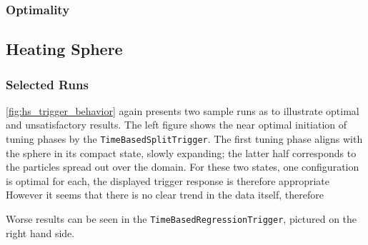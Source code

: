 \subsubsection{Optimality}

\newpage
\subsection{Heating Sphere}
\subsubsection{Selected Runs}
\autoref{fig:hs_trigger_behavior} again presents two sample runs as to illustrate optimal and unsatisfactory results. The left figure shows the near optimal initiation of tuning phases by the \texttt{TimeBasedSplitTrigger}. %
The first tuning phase aligns with the sphere in its compact state, slowly expanding; the latter half corresponds to the particles spread out over the domain. For these two states, one configuration is optimal for each, the displayed trigger response is therefore appropriate However it seems that there is no clear trend in the data itself, therefore \textellipsis %

Worse results can be seen in the \texttt{TimeBasedRegressionTrigger}, pictured on the right hand side.

